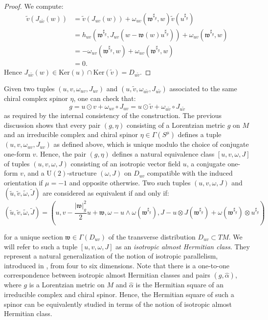 \documentclass[10pt,a4paper,twoside,reqno]{amsart}
\theoremstyle{plain}
\theoremstyle{definition}
\theoremstyle{remark}
\def\U{\mathrm{U}}
\renewcommand{\ker}{\mathrm{Ker}}
\begin{document}
\begin{proof}
\noindent
We compute:
\begin{align*}
\tilde{v}(J_{u\tilde{v}}(w)) &= \tilde{v}(J_{uv}(w)) + \omega_{uv}(\mathfrak{w}^{\sharp_g}, w) \tilde{v}(u^{\sharp_g}) \\
&= h_{uv}(\mathfrak{w}^{\sharp_g} , J_{uv}(w - \mathfrak{w}(w) u^{\sharp_g})) + \omega_{uv}(\mathfrak{w}^{\sharp_g}, w)  \\
&= - \omega_{uv}(\mathfrak{w}^{\sharp_g}, w)   + \omega_{uv}(\mathfrak{w}^{\sharp_g}, w) \\
&= 0.
\end{align*}
Hence $J_{u\tilde{v}}(w) \in \ker(u) \cap \ker(\tilde{v})=D_{u\tilde{v}}$.
\end{proof}

Given two tuples $(u,v,\omega_{uv},J_{uv})$ and $(u,\tilde{v},\omega_{u\tilde{v}},J_{u\tilde{v}})$ associated to the same chiral complex spinor $\eta$, one can check that:
\begin{equation*}
g = u\odot v + \omega_{uv} \circ J_{uv} = u\odot \tilde{v} + \omega_{u\tilde{v}} \circ J_{u\tilde{v}} 
\end{equation*}
as required by the internal consistency of the construction.  The previous discussion shows that every pair $(g,\eta)$ consisting of a Lorentzian metric $g$ on $M$ and an irreducible complex and chiral spinor $\eta\in \Gamma(S^{\mu})$ defines a tuple $(u,v,\omega_{uv},J_{uv})$ as defined above, which is unique modulo the choice of conjugate one-form $v$. Hence, the pair $(g,\eta)$ defines a natural equivalence class $[u,v,\omega,J]$ of tuples $(u,v,\omega,J)$ consisting of an isotropic vector field $u$, a conjugate one-form $v$, and a $\U(2)$-structure $(\omega,J)$ on $D_{uv}$ compatible with the induced orientation if $\mu = -1$ and opposite otherwise. Two such tuples $(u,v,\omega,J)$ and $(\tilde{u},\tilde{v},\tilde{\omega},\tilde{J})$ are considered as equivalent if and only if:
\begin{equation}
\label{eq:equivalence_relation_(u,v,omega)}
(\tilde{u},\tilde{v},\tilde{\omega},\tilde{J})=(u,v-\frac{\vert \mathfrak{w}\vert_g^2}{2}u+\mathfrak{w},\omega-u\wedge\omega(\mathfrak{w}^{\sharp_g}), J  -u\otimes J(\mathfrak{w}^{\sharp_g}) + \omega(\mathfrak{w}^{\sharp_g})\otimes u^{\sharp_g})
\end{equation}

for a unique section $\mathfrak{w} \in \Gamma(D_{uv})$ of the transverse distribution $D_{uv}\subset TM$. We will refer to such a tuple $[u,v,\omega,J]$ as an \emph{isotropic almost Hermitian class}. They represent a natural generalization of the notion of isotropic parallelism, introduced in \cite{ShahbaziThesis}, from four to six dimensions. Note that there is a one-to-one correspondence between isotropic almost Hermitian classes and pairs $(g,\widehat{\alpha})$, where $g$ is a Lorentzian metric on $M$ and $\widehat{\alpha}$ is the Hermitian square of an irreducible complex and chiral spinor. Hence, the Hermitian square of such a spinor can be equivalently studied in terms of the notion of isotropic almost Hermitian class.
\end{document}
